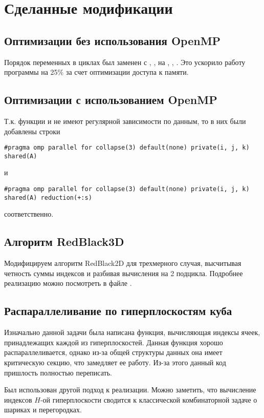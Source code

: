 \section{Сделанные модификации}


\subsection{Оптимизации без использования OpenMP}
Порядок переменных в циклах был заменен с , ,  на , , . Это ускорило работу программы на 25\% за счет оптимизации доступа к памяти.

\subsection{Оптимизации с использованием OpenMP}
Т.к. функции  и  не имеют регулярной зависимости по данным, то в них были добавлены строки
\begin{lstlisting}
#pragma omp parallel for collapse(3) default(none) private(i, j, k) shared(A)
\end{lstlisting}
и
\begin{lstlisting}
#pragma omp parallel for collapse(3) default(none) private(i, j, k) shared(A) reduction(+:s)
\end{lstlisting}
соответственно.

\subsection{Алгоритм RedBlack3D}
Модифицируем алгоритм RedBlack2D для трехмерного случая, высчитывая четность суммы индексов  и разбивая вычисления на 2 подцикла. Подробнее реализацию можно посмотреть в файле .

\subsection{Распараллеливание по гиперплоскостям куба}
Изначально данной задачи была написана функция, вычисляющая индексы ячеек, принадлежащих каждой из гиперплоскостей. Данная функция хорошо распараллеливается, однако из-за общей структуры данных она имеет критическую секцию, что замедляет ее работу. Из-за этого данный код пришлость полностью переписать.

Был использован другой подход к реализации. Можно заметить, что вычисление индексов $H$-ой гиперплоскости сводится к классической комбинаторной задаче о шариках и перегородках.

